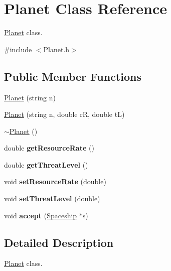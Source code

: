 \hypertarget{classPlanet}{}\section{Planet Class Reference}
\label{classPlanet}


\hyperlink{classPlanet}{Planet} class.  




{\ttfamily \#include $<$Planet.\+h$>$}

\subsection*{Public Member Functions}
\begin{DoxyCompactItemize}
\item 
\hyperlink{classPlanet_ae98ce54858c1174201987d73228fa29b}{Planet} (string n)
\item 
\hyperlink{classPlanet_afd66d974488511c495e6e5aa2e886085}{Planet} (string n, double rR, double tL)
\item 
\hyperlink{classPlanet_aaa1aaed9d4ef90b4836531edb7b18e0a}{$\sim$\+Planet} ()
\item 
\mbox{\label{classPlanet_ab8b1c3018f15bb37af41371526c6bbe2}} 
double {\bfseries get\+Resource\+Rate} ()
\item 
\mbox{\label{classPlanet_a4bda8bf9239f4d3c7a0a60a1ed52edea}} 
double {\bfseries get\+Threat\+Level} ()
\item 
\mbox{\label{classPlanet_a305bd81b25e55ad28cb966b5ac4e4dce}} 
void {\bfseries set\+Resource\+Rate} (double)
\item 
\mbox{\label{classPlanet_a765f62442f84f54666f9975633478930}} 
void {\bfseries set\+Threat\+Level} (double)
\item 
\mbox{\label{classPlanet_aea9b459b5f5d28555632a1e334cd8d3a}} 
void {\bfseries accept} (\hyperlink{classSpaceship}{Spaceship} $\ast$s)
\end{DoxyCompactItemize}


\subsection{Detailed Description}
\hyperlink{classPlanet}{Planet} class. 

